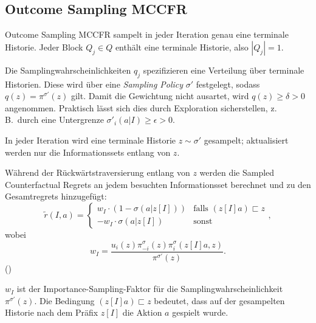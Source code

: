 \subsection{Outcome Sampling MCCFR}

Outcome Sampling MCCFR sampelt in jeder Iteration genau eine terminale Historie.
Jeder Block $Q_j \in Q$ enthält eine terminale Historie, also $|Q_j| = 1$.

Die Samplingwahrscheinlichkeiten $q_j$ spezifizieren eine Verteilung über terminale Historien.
Diese wird über eine \emph{Sampling Policy} $\sigma'$ festgelegt, sodass $q(z) = \pi^{\sigma'}(z)$ gilt.
Damit die Gewichtung nicht ausartet, wird $q(z)\ge \delta>0$ angenommen. Praktisch lässt sich dies durch Exploration sicherstellen, z.\,B.\ durch eine Untergrenze $\sigma'_i(a|I)\ge \epsilon>0$.

In jeder Iteration wird eine terminale Historie $z \sim \sigma'$ gesampelt; aktualisiert werden nur die Informationssets entlang von $z$.

Während der Rückwärtstraversierung entlang von $z$ werden die Sampled Counterfactual Regrets an jedem besuchten Informationsset berechnet und zu den Gesamtregrets hinzugefügt:
\begin{equation}
\tilde{r}(I, a) = \begin{cases}
w_I \cdot (1 - \sigma(a|z[I])) & \text{falls } (z[I]a) \sqsubset z \\
-w_I \cdot \sigma(a|z[I]) & \text{sonst}
\end{cases},
\end{equation}
wobei
\begin{equation}
w_I = \frac{u_i(z) \pi_{-i}^\sigma(z) \pi_i^\sigma(z[I]a, z)}{\pi^{\sigma'}(z)}.
\end{equation}
(\cite[Eq.~10]{lanctot2009monte})

$w_I$ ist der Importance-Sampling-Faktor für die Samplingwahrscheinlichkeit $\pi^{\sigma'}(z)$. 
Die Bedingung $(z[I]a)\sqsubset z$ bedeutet, dass auf der gesampelten Historie nach dem Präfix $z[I]$ die Aktion $a$ gespielt wurde.
